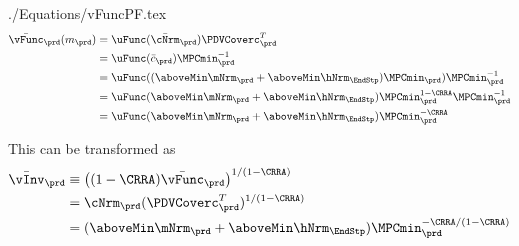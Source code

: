 \documentclass[\econtexRoot/SolvingMicroDSOPs]{subfiles}
\begin{document}
\begin{verbatimwrite}{./Equations/vFuncPF.tex}
  \begin{equation}\begin{gathered}\begin{aligned}
        \bar{\vFunc}_{\prd}({m}_{\prd})  & = \uFunc(\bar{\cNrm}_{\prd})\PDVCoverc_{\prd}^{T}\label{eq:vFuncPF}
        \\  & = \uFunc(\bar{c}_{\prd}) \MPCmin_{\prd}^{-1} %
        \\  & = \uFunc((\aboveMin \mNrm_{\prd}+\aboveMin \hNrm_{\EndStp})\MPCmin_{\prd}) \MPCmin_{\prd}^{-1} %
        \\  & = \uFunc(\aboveMin \mNrm_{\prd}+\aboveMin \hNrm_{\EndStp})\MPCmin_{\prd}^{1-\CRRA} \MPCmin_{\prd}^{-1} %
        \\  & = \uFunc(\aboveMin \mNrm_{\prd}+\aboveMin \hNrm_{\EndStp})\MPCmin_{\prd}^{-\CRRA}  %
      \end{aligned}\end{gathered}\end{equation}

  This can be transformed as
  \begin{equation*}\begin{gathered}\begin{aligned}
        \bar{\vInv}_{\prd}  & \equiv  \left((1-\CRRA)\bar{\vFunc}_{\prd}\right)^{1/(1-\CRRA)}
        \\  & = \cNrm_{\prd}(\PDVCoverc_{\prd}^{T})^{1/(1-\CRRA)}
        \\  & = (\aboveMin \mNrm_{\prd}+\aboveMin \hNrm_{\EndStp})\MPCmin_{\prd}^{-\CRRA/(1-\CRRA)}   %
      \end{aligned}\end{gathered}\end{equation*}
\end{verbatimwrite}
\unskip
\end{document}
